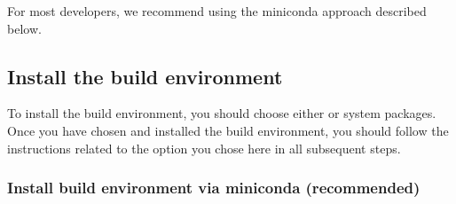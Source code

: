 \documentclass[letterpaper,10pt,english,openany,oneside]{sphinxmanual}
\begin{document}
\sphinxAtStartPar
For most developers, we recommend using the miniconda approach
described below.


\subsection{Install the build environment}
\label{\detokenize{docs/guide-chapter-contributing:install-the-build-environment}}
\sphinxAtStartPar
To install the build environment, you should choose either  or
system packages. Once you have chosen and installed the build
environment, you should follow the instructions related to the option
you chose here in all subsequent steps.


\subsubsection{Install build environment via miniconda (recommended)}
\end{document}
